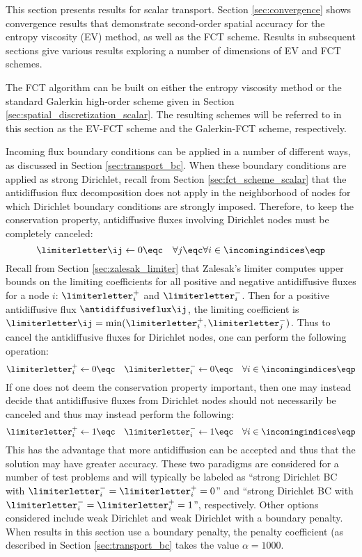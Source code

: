 This section presents results for scalar transport.
Section \ref{sec:convergence} shows convergence results that
demonstrate second-order spatial accuracy for the entropy
viscosity (EV) method, as well as the FCT scheme.
Results in subsequent sections give various results exploring a number of
dimensions of EV and FCT schemes.

The FCT algorithm can be built on either the entropy viscosity
method or the standard Galerkin high-order scheme given in
Section \ref{sec:spatial_discretization_scalar}. The resulting
schemes will be referred to in this section as the EV-FCT scheme
and the Galerkin-FCT scheme, respectively.

Incoming flux boundary conditions can be applied in a number of
different ways, as discussed in Section \ref{sec:transport_bc}.
When these boundary conditions are applied as strong Dirichlet,
recall from Section \ref{sec:fct_scheme_scalar} that the antidiffusion
flux decomposition does not apply in the neighborhood of nodes
for which Dirichlet boundary conditions are strongly imposed.
Therefore, to keep the conservation property, antidiffusive fluxes
involving Dirichlet nodes must be completely canceled:
\begin{equation}
  \limiterletter\ij \gets 0 \eqc \quad \forall j \eqc
    \forall i \in \incomingindices \eqp
\end{equation}
Recall from Section \ref{sec:zalesak_limiter} that Zalesak's limiter
computes upper bounds on the limiting coefficients for all positive
and negative antidiffusive fluxes for a node $i$: $\limiterletter_i^+$
and $\limiterletter_i^-$. Then for a positive antidiffusive flux
$\antidiffusiveflux\ij$, the limiting coefficient is
$\limiterletter\ij=\min(\limiterletter_i^+,\limiterletter_j^-)$.
Thus to cancel the antidiffusive fluxes for Dirichlet nodes, one can
perform the following operation:
\begin{equation}
  \limiterletter_i^+ \gets 0 \eqc \quad
  \limiterletter_i^- \gets 0 \eqc \quad
    \forall i \in \incomingindices \eqp
\end{equation}
If one does not deem the conservation property important, then one may
instead decide that antidiffusive fluxes from Dirichlet nodes should
not necessarily be canceled and thus may instead perform the following:
\begin{equation}
  \limiterletter_i^+ \gets 1 \eqc \quad
  \limiterletter_i^- \gets 1 \eqc \quad
    \forall i \in \incomingindices \eqp
\end{equation}
This has the advantage that more antidiffusion can be accepted and
thus that the solution may have greater accuracy. These two
paradigms are considered for a number of test problems and will
typically be labeled as
``strong Dirichlet BC with $\limiterletter_i^-=\limiterletter_i^+=0$''
and ``strong Dirichlet BC with $\limiterletter_i^-=\limiterletter_i^+=1$'',
respectively. Other options considered include weak Dirichlet and
weak Dirichlet with a boundary penalty. When results in this
section use a boundary penalty, the penalty coefficient (as described
in Section \ref{sec:transport_bc} takes the value $\alpha=1000$.

